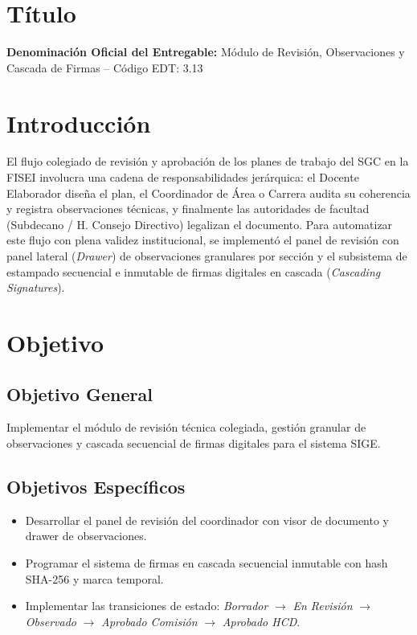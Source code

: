 \documentclass[12pt,a4paper]{article}
\begin{document}
\section{Título}
\textbf{Denominación Oficial del Entregable:} Módulo de Revisión, Observaciones y Cascada de Firmas -- Código EDT: 3.13

\section{Introducción}
El flujo colegiado de revisión y aprobación de los planes de trabajo del SGC en la FISEI involucra una cadena de responsabilidades jerárquica: el Docente Elaborador diseña el plan, el Coordinador de Área o Carrera audita su coherencia y registra observaciones técnicas, y finalmente las autoridades de facultad (Subdecano / H. Consejo Directivo) legalizan el documento. Para automatizar este flujo con plena validez institucional, se implementó el panel de revisión con panel lateral (\textit{Drawer}) de observaciones granulares por sección y el subsistema de estampado secuencial e inmutable de firmas digitales en cascada (\textit{Cascading Signatures}).

\section{Objetivo}
\subsection{Objetivo General}
Implementar el módulo de revisión técnica colegiada, gestión granular de observaciones y cascada secuencial de firmas digitales para el sistema SIGE.
\subsection{Objetivos Específicos}
\begin{itemize}[leftmargin=1.5em, itemsep=2pt]
    \item Desarrollar el panel de revisión del coordinador con visor de documento y drawer de observaciones.
    \item Programar el sistema de firmas en cascada secuencial inmutable con hash SHA-256 y marca temporal.
    \item Implementar las transiciones de estado: \textit{Borrador} $\to$ \textit{En Revisión} $\to$ \textit{Observado} $\to$ \textit{Aprobado Comisión} $\to$ \textit{Aprobado HCD}.
\end{itemize}
\end{document}
